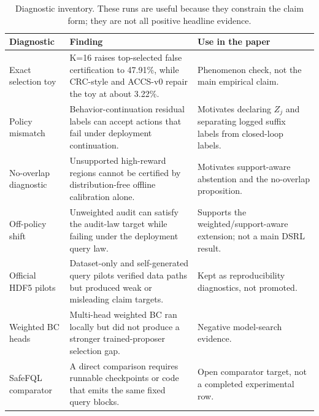 \documentclass[letterpaper]{article}
\begin{document}
\begin{table}[t]
\centering
\small
\setlength{\tabcolsep}{5pt}
\begin{tabular}{p{}p{}p{}}
\toprule
Diagnostic & Finding & Use in the paper \\
\midrule
Exact selection toy & K=16 raises top-selected false certification to 47.91\%,
while CRC-style and ACCS-v0 repair the toy at about 3.22\%. & Phenomenon check,
not the main empirical claim. \\
Policy mismatch & Behavior-continuation residual labels can accept actions
that fail under deployment continuation. & Motivates declaring $Z_j$ and
separating logged suffix labels from closed-loop labels. \\
No-overlap diagnostic & Unsupported high-reward regions cannot be certified by
distribution-free offline calibration alone. & Motivates support-aware
abstention and the no-overlap proposition. \\
Off-policy shift & Unweighted audit can satisfy the audit-law target while
failing under the deployment query law. & Supports the weighted/support-aware
extension; not a main DSRL result. \\
Official HDF5 pilots & Dataset-only and self-generated query pilots verified
data paths but produced weak or misleading claim targets. & Kept as
reproducibility diagnostics, not promoted. \\
Weighted BC heads & Multi-head weighted BC ran locally but did not produce a
stronger trained-proposer selection gap. & Negative model-search evidence. \\
SafeFQL comparator & A direct comparison requires runnable checkpoints or code
that emits the same fixed query blocks. & Open comparator target, not a
completed experimental row. \\
\bottomrule
\end{tabular}
\caption{Diagnostic inventory. These runs are useful because they constrain the
claim form; they are not all positive headline evidence.}
\label{tab:app-diagnostics}
\end{table}
\end{document}

